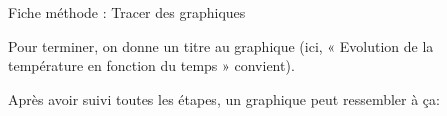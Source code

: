 \documentclass[10pt]{article}
\newcommand{\titre}{Fiche méthode : Tracer des graphiques} %
\begin{document}
\begin{titlebox}{\titre}
    \begin{center}        
    \begin{minipage}[c]{0.25\textwidth}
        Pour terminer, on donne un titre au graphique 
        (ici, « Evolution de la température en fonction du temps »
        convient).

        Après avoir suivi toutes les étapes, un graphique peut
        ressembler à ça:
    \end{minipage}
    \hspace{10pt}
    \begin{minipage}[c]{0.7\textwidth}
        \centering
    \end{minipage}
    \end{center}
    
\end{titlebox}
\end{document}

